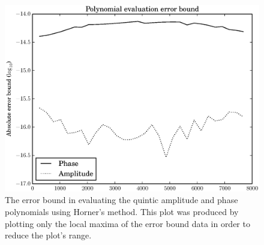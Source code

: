 \begin{figure}[!t]
    \centering
    \includegraphics[width=\figwidthscale\textwidth]{plots/mq_mod_quintic_poly_eval_err.eps}
    \caption{The error bound in evaluating the quintic amplitude and phase
    polynomials using Horner's method. This plot was produced by plotting only
    the local maxima of the error bound data in order to reduce the plot's
    range.\label{plot:mqmodquinticpolyevalerr}}
\end{figure}
